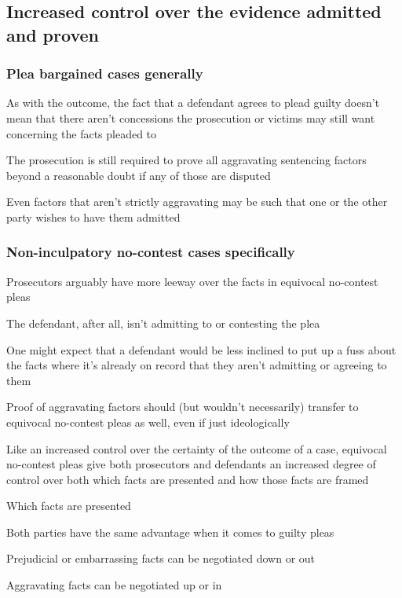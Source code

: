 \subsection{Increased control over the evidence admitted and proven}

\subsubsection{Plea bargained cases generally}



As with the outcome, the fact that a defendant agrees to plead guilty doesn't mean that there aren't concessions the prosecution or victims may still want concerning the facts pleaded to

The prosecution is still required to prove all aggravating sentencing factors beyond a reasonable doubt if any of those are disputed

Even factors that aren't strictly aggravating may be such that one or the other party wishes to have them admitted 

\subsubsection{Non-inculpatory no-contest cases specifically}

Prosecutors arguably have more leeway over the facts in equivocal no-contest pleas

The defendant, after all, isn't admitting to or contesting the plea

One might expect that a defendant would be less inclined to put up a fuss about the facts where it's already on record that they aren't admitting or agreeing to them

Proof of aggravating factors should (but wouldn't necessarily) transfer to equivocal no-contest pleas as well, even if just ideologically

Like an increased control over the certainty of the outcome of a case, equivocal no-contest pleas give both prosecutors and defendants an increased degree of control over both which facts are presented and how those facts are framed

Which facts are presented

Both parties have the same advantage when it comes to guilty pleas

Prejudicial or embarrassing facts can be negotiated down or out

Aggravating facts can be negotiated up or in

